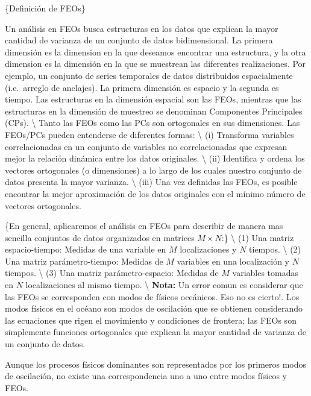 \documentclass[
]{agujournal2019}
\begin{document}
\vspace{0.25cm}

\{\textbf \noindent Definición de FEOs\}

Un análisis en FEOs busca estructuras en los datos que explican la mayor
cantidad de varianza de un conjunto de datos bidimensional. La primera
dimensión es la dimension en la que deseamos encontrar una estructura, y
la otra dimension es la dimensión en la que se muestrean las diferentes
realizaciones. Por ejemplo, un conjunto de series temporales de datos
distribuidos espacialmente (i.e.~arreglo de anclajes). La primera
dimensión es espacio y la segunda es tiempo. Las estructuras en la
dimensión espacial son las FEOs, mientras que las estructuras en la
dimensión de muestreo se denominan Componentes Principales (CPs).
\textbackslash{} Tanto las FEOs como las PCs son ortogonales en sus
dimensiones. Las FEOs/PCs pueden entenderse de diferentes formas:
\textbackslash{} (i) Transforma variables correlacionadas en un conjunto
de variables no correlacionadas que expresan mejor la relación dinámica
entre los datos originales. \textbackslash{} (ii) Identifica y ordena
los vectores ortogonales (o dimensiones) a lo largo de los cuales
nuestro conjunto de datos presenta la mayor varianza. \textbackslash{}
(iii) Una vez definidas las FEOs, es posible encontrar la mejor
aproximación de los datos originales con el mínimo número de vectores
ortogonales.

\vspace{0.25cm}

\{\noindent En general, aplicaremos el análisis en FEOs para describir
de manera mas sencilla conjuntos de datos organizados en matrices
\(M\times N\):\} \textbackslash{} (1) Una matriz espacio-tiempo: Medidas
de una variable en \(M\) localizaciones y \(N\) tiempos.
\textbackslash{} (2) Una matriz parámetro-tiempo: Medidas de \(M\)
variables en una localización y \(N\) tiempos. \textbackslash{} (3) Una
matriz parámetro-espacio: Medidas de \(M\) variables tomadas en \(N\)
localizaciones al mismo tiempo. \textbackslash{} \textbf {Nota:} Un
error comun es considerar que las FEOs se corresponden con modos de
físicos oceánicos. Eso no es cierto!. Los modos físicos en el océano son
modos de oscilación que se obtienen considerando las ecuaciones que
rigen el movimiento y condiciones de frontera; las FEOs son simplemente
funciones ortogonales que explican la mayor cantidad de varianza de un
conjunto de datos.

Aunque los procesos físicos dominantes son representados por los
primeros modos de oscilación, no existe una correspondencia uno a uno
entre modos físicos y FEOs.
\end{document}
